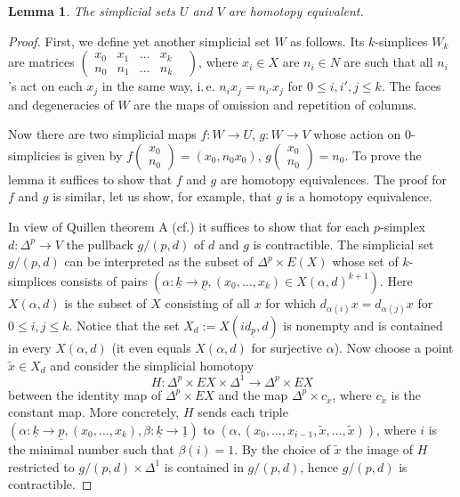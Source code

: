 \documentclass[oneside, 10pt]{amsart}
\theoremstyle{plain}
\numberwithin{equation}{section}
\newtheorem{lemma}{Lemma}
\numberwithin{lemma}{section}
\theoremstyle{remark}
\theoremstyle{definition}
\begin{document}
\begin{lemma} \label{lm:quillen-a} The simplicial sets $U$ and $V$ are homotopy equivalent. \end{lemma}
\begin{proof} First, we define yet another simplicial set $W$ as follows.
Its $k$-simplices $W_k$ are matrices $\left(\begin{smallmatrix}x_0 & x_1 & \ldots & x_k&\\ n_0 & n_1 & \ldots & n_k \end{smallmatrix}\right)$,
 where $x_i\in X$ are $n_i\in N$ are such that all $n_i$'s act on each $x_j$ in the same way, i.\,e. $n_ix_j = n_{i'} x_j$ for $0\leq i,i',j\leq k$. 
 The faces and degeneracies of $W$ are the maps of omission and repetition of columns.
 
 Now there are two simplicial maps $f\colon W\to U$, $g\colon W\to V$ whose action on $0$-simplicies is given by 
  $f\left(\begin{smallmatrix}x_0 \\ n_0\end{smallmatrix}\right) = (x_0, n_0x_0)$, 
  $g\left(\begin{smallmatrix}x_0 \\ n_0\end{smallmatrix}\right) = n_0$. 
 To prove the lemma it suffices to show that $f$ and $g$ are homotopy equivalences. 
 The proof for $f$ and $g$ is similar, let us show, for example, that $g$ is a homotopy equivalence.
 
 In view of Quillen theorem A (cf.\cite[ex.~IV.3.11]{Kbook}) it suffices to show that for each $p$-simplex $d \colon \Delta^p \to V$ the 
  pullback $g/(p, d)$ of $d$ and $g$ is contractible.
 The simplicial set $g/(p, d)$ can be interpreted as the subset of $\Delta^p \times E(X)$ whose set of $k$-simplices consists of pairs
  $(\alpha\colon \underline{k}\to \underline{p}, (x_0, \ldots, x_k)\in X(\alpha, d)^{k+1})$.
 Here $X(\alpha, d)$ is the subset of $X$ consisting of all $x$ for which $d_{\alpha(i)}x = d_{\alpha(j)}x$ for $0\leq i,j\leq k$.
 Notice that the set $X_d := X(id_{\underline{p}}, d)$ is nonempty and is contained in every $X(\alpha, d)$ (it even equals $X(\alpha, d)$ for surjective $\alpha$).
 Now choose a point $\widetilde{x}\in X_d$ and consider the simplicial homotopy \[H\colon \Delta^p \times EX \times \Delta^1 \to \Delta^p\times EX\] 
  between the identity map of $\Delta^p \times EX$ and
 the map $\Delta^p \times c_{\widetilde{x}}$, where $c_{\widetilde{x}}$ is the constant map. 
 More concretely, $H$ sends each triple $(\alpha\colon \underline{k} \to \underline{p}, (x_0, \ldots, x_k), \beta\colon \underline{k}\to\underline{1})$
 to $(\alpha, (x_0, \ldots, x_{i-1}, \widetilde{x}, \ldots, \widetilde{x}))$, where $i$ is the minimal number such that $\beta(i)=1$.
 By the choice of $\widetilde{x}$ the image of $H$ restricted to $g/(p, d)\times \Delta^1$ is contained in $g/(p, d)$, hence $g/(p, d)$ is contractible. 
\end{proof}
\end{document}
